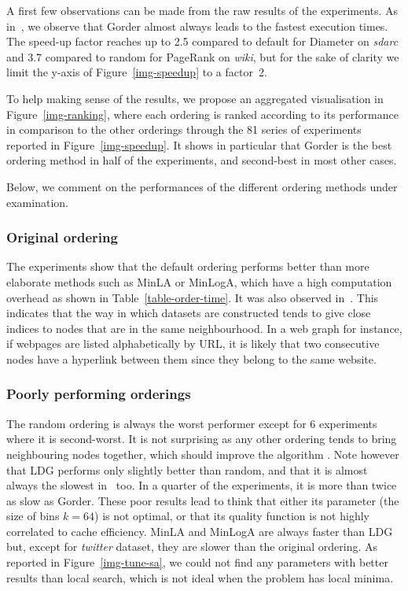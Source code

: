 A first few observations can be made from the raw results of the experiments.
%
As in~\cite{gorder}, we observe that Gorder almost always leads to the fastest execution times.
%
The speed-up factor reaches up to 2.5 compared to default for Diameter on \textit{sdarc} and 3.7 compared to random for PageRank on \textit{wiki}, but for the sake of clarity we limit the y-axis of Figure~\ref{img-speedup} to a factor~2.

To help making sense of the results, we propose an aggregated visualisation in Figure~\ref{img-ranking}, where each ordering is ranked according to its performance in comparison to the other orderings through the 81 series of experiments reported in Figure~\ref{img-speedup}. It shows in particular that Gorder is the best ordering method in half of the experiments, and second-best in most other cases. 

Below, we comment on the performances of the different ordering methods under examination.




\subsubsection{Original ordering}
The experiments show that the default ordering performs better than more elaborate methods such as MinLA or MinLogA, which have a high computation overhead as shown in Table~\ref{table-order-time}. It was also observed in~\cite{gorder}.
%
This indicates that the way in which datasets are constructed tends to give close indices to nodes that are in the same neighbourhood. 
%
In a web graph for instance, if webpages are listed alphabetically by URL, it is likely that two consecutive nodes have a hyperlink between them since they belong to the same website.


\subsubsection{Poorly performing orderings}
The random ordering is always the worst performer except for 6 experiments where it is second-worst. It is not surprising as any other ordering tends to bring neighbouring nodes together, which should improve the algorithm \runtime.
%
Note however that LDG performs only slightly better than random, and that it is almost always the slowest in~\cite{gorder} too. In a quarter of the experiments, it is more than twice as slow as Gorder. These poor results lead to think that either its parameter (the size of bins $k=64$) is not optimal, or that its quality function is not highly correlated to cache efficiency.
%
MinLA and MinLogA are always faster than LDG but, except for \textit{twitter} dataset, they are slower than the original ordering. As reported in Figure~\ref{img-tune-sa}, we could not find any parameters with better results than local search, which is not ideal when the problem has local minima.


